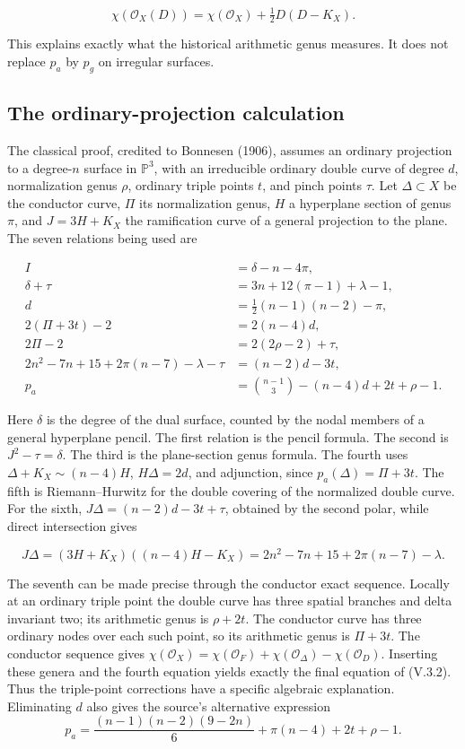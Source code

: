 \[
\chi(\mathcal O_X(D))=\chi(\mathcal O_X)+\tfrac12D(D-K_X).
\]

This explains exactly what the historical arithmetic genus measures. It does not replace \(p_a\) by \(p_g\) on irregular surfaces.

\subsection{The ordinary-projection calculation}

The classical proof, credited to Bonnesen (1906), assumes an ordinary projection to a degree-\(n\) surface in \(\mathbb P^3\), with an irreducible ordinary double curve of degree \(d\), normalization genus \(\rho\), ordinary triple points \(t\), and pinch points \(\tau\). Let \(\Delta\subset X\) be the conductor curve, \(\Pi\) its normalization genus, \(H\) a hyperplane section of genus \(\pi\), and \(J=3H+K_X\) the ramification curve of a general projection to the plane. The seven relations being used are

\[
\begin{aligned}
I&=\delta-n-4\pi,\\
\delta+\tau&=3n+12(\pi-1)+\lambda-1,\\
d&=\tfrac12(n-1)(n-2)-\pi,\\
2(\Pi+3t)-2&=2(n-4)d,\\
2\Pi-2&=2(2\rho-2)+\tau,\\
2n^2-7n+15+2\pi(n-7)-\lambda-\tau&=(n-2)d-3t,\\
p_a&=\binom{n-1}{3}-(n-4)d+2t+\rho-1.
\end{aligned} \tag{V.3.2}
\]

Here \(\delta\) is the degree of the dual surface, counted by the nodal members of a general hyperplane pencil. The first relation is the pencil formula. The second is \(J^2-\tau=\delta\). The third is the plane-section genus formula. The fourth uses \(\Delta+K_X\sim(n-4)H\), \(H\Delta=2d\), and adjunction, since \(p_a(\Delta)=\Pi+3t\). The fifth is Riemann--Hurwitz for the double covering of the normalized double curve. For the sixth, \(J\Delta=(n-2)d-3t+\tau\), obtained by the second polar, while direct intersection gives

\[
J\Delta=(3H+K_X)((n-4)H-K_X)
=2n^2-7n+15+2\pi(n-7)-\lambda.
\]

The seventh can be made precise through the conductor exact sequence. Locally at an ordinary triple point the double curve has three spatial branches and delta invariant two; its arithmetic genus is \(\rho+2t\). The conductor curve has three ordinary nodes over each such point, so its arithmetic genus is \(\Pi+3t\). The conductor sequence gives \(\chi(\mathcal O_X)=\chi(\mathcal O_F)+\chi(\mathcal O_\Delta)-\chi(\mathcal O_D)\). Inserting these genera and the fourth equation yields exactly the final equation of (V.3.2). Thus the triple-point corrections have a specific algebraic explanation. Eliminating \(d\) also gives the source's alternative expression \[
p_a=\frac{(n-1)(n-2)(9-2n)}6+\pi(n-4)+2t+\rho-1.
\]

